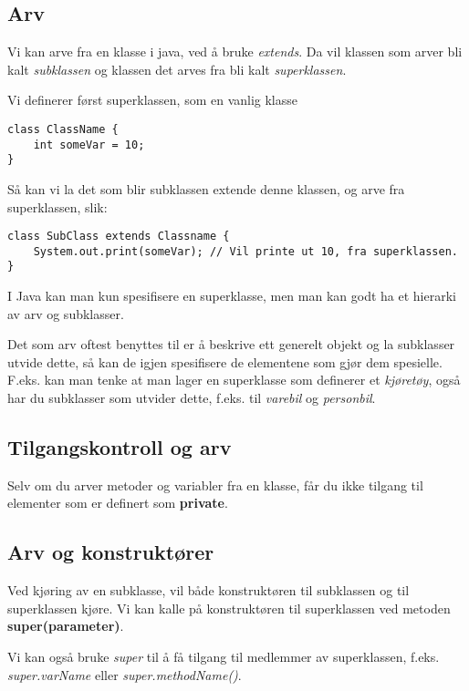 \documentclass[a4paper,norsk,10pt]{article}
\begin{document}
\subsection{Arv}
\label{sec-18.1}

Vi kan arve fra en klasse i java, ved å bruke \emph{extends}. Da vil
klassen som arver bli kalt \emph{subklassen} og klassen det arves fra bli
kalt \emph{superklassen}.

Vi definerer først superklassen, som en vanlig klasse

\begin{verbatim}
class ClassName {
    int someVar = 10;
}
\end{verbatim}

Så kan vi la det som blir subklassen extende denne klassen, og arve
fra superklassen, slik:

\begin{verbatim}
class SubClass extends Classname {
    System.out.print(someVar); // Vil printe ut 10, fra superklassen.
}
\end{verbatim}

I Java kan man kun spesifisere en superklasse, men man kan godt ha et
hierarki av arv og subklasser.

Det som arv oftest benyttes til er å beskrive ett generelt objekt og
la subklasser utvide dette, så kan de igjen spesifisere de elementene
som gjør dem spesielle. F.eks. kan man tenke at man lager en
superklasse som definerer et \emph{kjøretøy}, også har du subklasser som
utvider dette, f.eks. til \emph{varebil} og \emph{personbil}.
\subsection{Tilgangskontroll og arv}
\label{sec-18.2}


Selv om du arver metoder og variabler fra en klasse, får du ikke
tilgang til elementer som er definert som \textbf{private}.
\subsection{Arv og konstruktører}
\label{sec-18.3}


Ved kjøring av en subklasse, vil både konstruktøren til subklassen og
til superklassen kjøre. Vi kan kalle på konstruktøren til superklassen
ved metoden \textbf{super(parameter)}.

Vi kan også bruke \emph{super} til å få tilgang til medlemmer av
superklassen, f.eks. \emph{super.varName} eller \emph{super.methodName()}.
\end{document}

